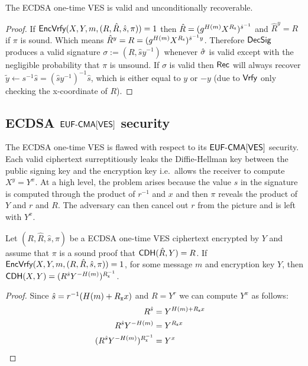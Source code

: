 \begin{lemma}
The ECDSA one-time VES is valid and unconditionally recoverable.
\end{lemma}
\begin{proof}
If $\textsf{EncVrfy}(X,Y,m,(R, \hat{R},\hat{s}, \pi)) = 1$ then $\hat{R} = (g^{H(m)}X^{R_{\mathtt{x}}})^{\hat{s}^{-1}}$ and $\hat{R}^y = R$ if $\pi$ is sound. Which means $\hat{R}^{y} = R = (g^{H(m)}X^{R_{\mathtt{x}}})^{\hat{s}^{-1}y}$. Therefore $\textsf{DecSig}$ produces a valid signature $\sigma := (R, \hat{s}y^{-1})$ whenever $\hat{\sigma}$ is valid except with the negligible probability that $\pi$ is unsound. If $\sigma$ is valid then $\textsf{Rec}$ will always recover $\tilde{y} \gets s^{-1}\hat{s} = (\hat{s}y^{-1})^{-1}\hat{s}$, which is either equal to $y$ or $-y$ (due to $\textsf{Vrfy}$ only checking the x-coordinate of $R$).
\end{proof}


\subsection{ECDSA $\textsf{EUF-CMA}[\textsf{VES}]$ security}

The ECDSA one-time VES is flawed with respect to its $\textsf{EUF-CMA}[\textsf{VES}]$ security. Each valid ciphertext surreptitiously leaks the Diffie-Hellman key between the public signing key and the encryption key i.e.\ allows the receiver to compute $X^y = Y^x$.
At a high level, the problem arises because the value $s$ in the signature is computed through the product of $r^{-1}$ and $x$ and then $\pi$ reveals the product of $Y$ and $r$ and $R$.
The adversary can then cancel out $r$ from the picture and is left with $Y^x$.

\begin{lemma}
  \label{key-leak}
  Let $(R, \hat{R},\hat{s}, \pi)$ be a ECDSA one-time VES ciphertext encrypted by $Y$ and assume that $\pi$ is a sound proof that $\textsf{CDH}(\hat{R},Y) = R$.
  If $\textsf{EncVrfy}(X,Y,m,(R, \hat{R},\hat{s}, \pi)) = 1$, for some message $m$ and encryption key $Y$, then $\textsf{CDH}(X,Y) = (R^{\hat{s}}Y^{-H(m)})^{R_{\mathtt{x}}^{-1}}$.
\end{lemma}
\begin{proof}
  Since $\hat{s} = r^{-1}(H(m) + R_{\mathtt{x}}{}x)$ and $R = Y^r$ we can compute $Y^x$ as follows:
  \begin{align*}
    R^{\hat{s}} & = Y^{H(m) + R_{\mathtt{x}}{}x} &  \\
    R^{\hat{s}}Y^{-H(m)} & =  Y^{R_{\mathtt{x}}{}x} \\
    (R^{\hat{s}}Y^{-H(m)})^{R_{\mathtt{x}}^{-1}} & = Y^{x}
  \end{align*}
\end{proof}


